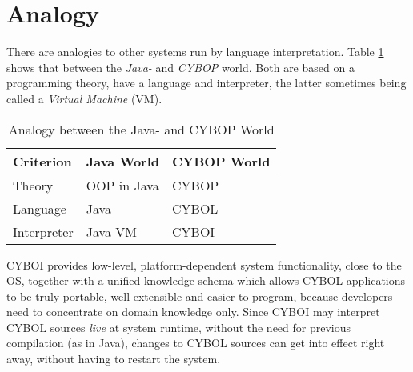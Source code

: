 %
%
%
%
%
%

\section{Analogy}
\label{analogy_heading}

There are analogies to other systems run by language interpretation. Table
\ref{analogy_table} shows that between the \emph{Java-} and \emph{CYBOP} world.
Both are based on a programming theory, have a language and interpreter, the
latter sometimes being called a \emph{Virtual Machine} (VM).

\begin{table}[ht]
    \begin{center}
        \begin{footnotesize}
        \begin{tabular}{| p{35mm} | p{35mm} | p{35mm} |}
            \hline
            \textbf{Criterion} & \textbf{Java World} & \textbf{CYBOP World}\\
            \hline
            Theory & OOP in Java & CYBOP\\
            \hline
            Language & Java & CYBOL\\
            \hline
            Interpreter & Java VM & CYBOI\\
            \hline
        \end{tabular}
        \end{footnotesize}
        \caption{Analogy between the Java- and CYBOP World}
        \label{analogy_table}
    \end{center}
\end{table}

CYBOI provides low-level, platform-dependent system functionality, close to the
OS, together with a unified knowledge schema which allows CYBOL applications to
be truly portable, well extensible and easier to program, because developers
need to concentrate on domain knowledge only. Since CYBOI may interpret CYBOL
sources \emph{live} at system runtime, without the need for previous compilation
(as in Java), changes to CYBOL sources can get into effect right away, without
having to restart the system.
